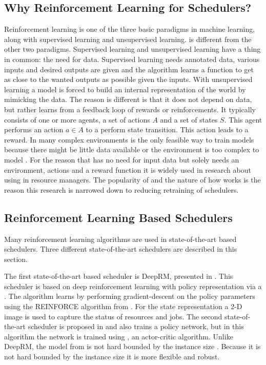 \subsection{Why Reinforcement Learning for Schedulers?}

Reinforcement learning is one of the three basic paradigms in machine
learning, along with supervised learning and unsupervised learning. \rl is
different from the other two paradigms. Supervised learning and unsupervised
learning have a thing in common: the need for data. Supervised learning needs
annotated data, various inputs and desired outputs are given and the algorithm
learns a function to get as close to the wanted outputs as possible given the
inputs. With unsupervised learning a model is forced to build an internal
representation of the world by mimicking the data. The reason \rl is different
is that it does not depend on data, but rather learns from a feedback loop of
rewards or reinforcements. It typically consists of one or more agents, a set
of actions $A$ and a set of states $S$. This agent performs an action $a \in
A$ to a perform state transition. This action leads to a reward. In many
complex environments \rl is the only feasible way to train models because
there might be little data available or the environment is too complex to
model \cite{russell2010}. For the reason that \rl has no need for input data
but solely needs an environment, actions and a reward function it is widely
used in research about using \ai in resource managers. The popularity of \rl
and the nature of how \rl works is the reason this research is narrowed down
to reducing retraining of \rl schedulers.


\subsection{Reinforcement Learning Based Schedulers}

Many reinforcement learning algorithms are used in state-of-the-art \rl
based schedulers. Three different state-of-the-art \rl schedulers are
described in this section.


The first state-of-the-art \rl based scheduler is DeepRM, presented in
. This scheduler is based on deep reinforcement learning with
policy representation via a \dnn. The algorithm learns by performing
gradient-descent on the policy parameters using the REINFORCE algorithm from
. For the state representation a 2-D image is used to
capture the status of resources and jobs. The second state-of-the-art
scheduler is proposed in  and also trains a policy network,
but in this algorithm the network is trained using \ppo, an actor-critic
algorithm. Unlike DeepRM, the model from  is not hard bounded
by the instance size \cite[p.~5]{zhang2020}. Because it is not hard bounded by
the instance size it is more flexible and robust.


